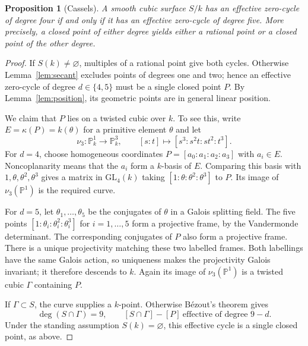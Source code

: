 \documentclass[a4paper,11pt]{amsart}
\numberwithin{equation}{section}
\newtheorem{proposition}[theorem]{Proposition}
\theoremstyle{definition}
\theoremstyle{remark}
\newtheorem{remark}[theorem]{Remark}
\newcommand{\PP}{\mathbb P}
\begin{document}
\begin{proposition}[Cassels]\label{prop:four-five}
A smooth cubic surface $S/k$ has an effective zero-cycle of degree
four if and only if it has an effective zero-cycle of degree five.
More precisely, a closed point of either degree yields either a
rational point or a closed point of the other degree.
\end{proposition}
\begin{proof}
If $S(k)\ne\varnothing$, multiples of a rational point give both
cycles. Otherwise Lemma~\ref{lem:secant} excludes points of degrees
one and two; hence an effective zero-cycle of degree
$d\in\{4,5\}$ must be a single closed point $P$. By
Lemma~\ref{lem:position}, its geometric points are in general linear
position.

We claim that $P$ lies on a twisted cubic over $k$.
To see this, write
$E=\kappa(P)=k(\theta)$ for a primitive element $\theta$ and let
\[
 \nu_3:\PP^1_k\longrightarrow\PP^3_k,
 \qquad [s:t]\longmapsto[s^3:s^2t:st^2:t^3].
\]
For $d=4$, choose homogeneous coordinates
$P=[a_0:a_1:a_2:a_3]$ with $a_i\in E$. Noncoplanarity means that
the $a_i$ form a $k$-basis of $E$. Comparing this basis with
$1,\theta,\theta^2,\theta^3$ gives a matrix in $\mathrm{GL}_4(k)$
taking $[1:\theta:\theta^2:\theta^3]$ to $P$.
Its image of $\nu_3(\PP^1)$ is the required curve.

For $d=5$, let $\theta_1,\ldots,\theta_5$ be the conjugates of
$\theta$ in a Galois splitting field. The five points
$[1:\theta_i:\theta_i^2:\theta_i^3]$ for $i=1,\dots ,5$ form a projective frame, by
the Vandermonde determinant. The corresponding conjugates of $P$
also form a projective frame. 
There is a unique projectivity matching
these two labelled frames. Both labellings have the same Galois action, 
so uniqueness makes the projectivity Galois invariant; it therefore
descends to $k$. 
Again its image of $\nu_3(\PP^1)$ is a 
twisted
cubic $\Gamma$ containing $P$.


If $\Gamma\subset S$, the curve supplies a $k$-point. Otherwise
B\'ezout's theorem gives
\begin{equation}\label{eq:residual}
 \deg(S\cap\Gamma)=9,
 \qquad [S\cap\Gamma]-[P]\ \text{effective of degree }9-d.
\end{equation}
Under the standing assumption $S(k)=\varnothing$, this effective
cycle is a single closed point, as above.
\end{proof}

\end{document}
